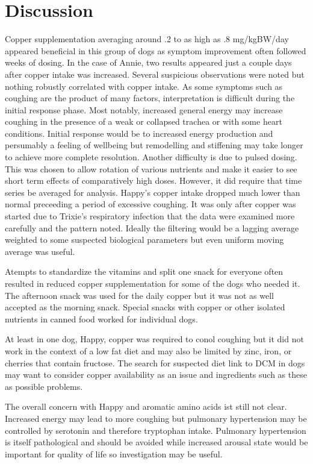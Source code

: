 \section{Discussion }


Copper supplementation averaging around .2 to as high 
as .8 mg/kgBW/day appeared beneficial in this group of
dogs as symptom improvement often followed weeks of dosing.
In the case of Annie, two results appeared just a couple
days after copper intake was increased. 
Several suspicious observations were noted but nothing
robustly correlated with copper intake. 
As some symptoms such as coughing are the product
of many factors, interpretation is difficult during the 
initial response phase. Most notably, increased general
energy may increase coughing in the presence of a weak
or collapsed trachea or with some heart conditions. 
Initial response would be to increased energy production
and persumably a feeling of wellbeing but remodelling
and stiffening 
may take longer to  achieve  more complete  
resolution. Another difficulty is  due to pulsed dosing.
This was chosen to allow rotation of various
nutrients and make it easier to see short term effects
of comparatively high doses. However, it did require 
that time series be averaged  for analysis.
Happy's copper intake dropped much lower than normal
preceeding a period of excessive coughing. It was only
after copper was started due to Trixie's  respiratory infection
that the data were examined more carefully and the pattern
noted. Ideally the filtering would be a lagging average
weighted to some suspected biological parameters but
even uniform moving average was useful.   

Atempts to standardize the vitamins and split one snack
for everyone often resulted in reduced copper
supplementation for some of the dogs who needed it.
The afternoon snack was used for the daily copper 
but it was not as well accepted as the morning snack.
Special snacks with copper or other isolated nutrients
in canned food worked for individual dogs. 


At least in one dog, Happy, copper was required to conol
coughing but it did not work in the context of a low fat
diet and may also be limited by zinc, iron, or cherries
that contain fructose.  The search for suspected diet link to
DCM in dogs may want to consider copper availability as an
issue and ingredients such as these as possible problems.


The overall concern with Happy and aromatic amino acids
ist still not clear. Increased energy may lead to more
coughing but 
pulmonary hypertension may be controlled by serotonin
\cite{PMID27927914} and therefore tryptophan intake. 
Pulmonary hypertension is itself pathological and
should be avoided while increased arousal state would
be important for quality of life so investigation may be useful. 


